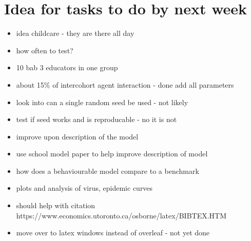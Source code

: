 \documentclass{article}
\begin{document}
\section{Idea for tasks to do by next week}
\begin{itemize}
\item idea childcare - they are there all day
\item how often to test?
\item 10 bab 3 educators in one group
\item about 15\% of intercohort agent interaction - done
\add add all parameters 
\item look into can a single random seed be used - not likely
\item test if seed works and is reproducable - no it is not

\item improve upon description of the model
\item use school model paper to help improve description of model
\item how does a behaviourable model compare to a benchmark
\item plots and analysis of virus, epidemic curves
\item should help with citation https://www.economics.utoronto.ca/osborne/latex/BIBTEX.HTM
 

\item move over to latex windows instead of overleaf - not yet done
\end{itemize}
\end{document}
